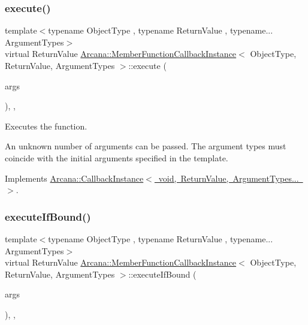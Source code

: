 \subsubsection{\texorpdfstring{execute()}{execute()}}
{\footnotesize\ttfamily template$<$typename Object\+Type , typename Return\+Value , typename... Argument\+Types$>$ \\
virtual Return\+Value \mbox{\hyperlink{class_arcana_1_1_member_function_callback_instance}{Arcana\+::\+Member\+Function\+Callback\+Instance}}$<$ Object\+Type, Return\+Value, Argument\+Types $>$\+::execute (\begin{DoxyParamCaption}\item[{Argument\+Types \&\&...}]{args }\end{DoxyParamCaption})\hspace{0.3cm}{\ttfamily [inline]}, {\ttfamily [override]}, {\ttfamily [virtual]}}



Executes the function. 

An unknown number of arguments can be passed. The argument types must coincide with the initial arguments specified in the template. 

Implements \mbox{\hyperlink{class_arcana_1_1_callback_instance_aa5bd9b4ee2129a0c22a98f7fa1cfc724}{Arcana\+::\+Callback\+Instance$<$ void, Return\+Value, Argument\+Types... $>$}}.

\mbox{\label{class_arcana_1_1_member_function_callback_instance_a4d8c12162b9d7b42ad9916d2dba5327d}} 
\subsubsection{\texorpdfstring{execute\+If\+Bound()}{executeIfBound()}}
{\footnotesize\ttfamily template$<$typename Object\+Type , typename Return\+Value , typename... Argument\+Types$>$ \\
virtual Return\+Value \mbox{\hyperlink{class_arcana_1_1_member_function_callback_instance}{Arcana\+::\+Member\+Function\+Callback\+Instance}}$<$ Object\+Type, Return\+Value, Argument\+Types $>$\+::execute\+If\+Bound (\begin{DoxyParamCaption}\item[{Argument\+Types \&\&...}]{args }\end{DoxyParamCaption})\hspace{0.3cm}{\ttfamily [inline]}, {\ttfamily [override]}, {\ttfamily [virtual]}}



